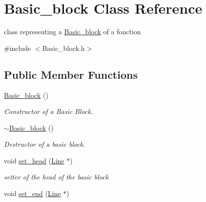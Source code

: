 \hypertarget{class_basic__block}{}\section{Basic\+\_\+block Class Reference}
\label{class_basic__block}


class representing a \hyperlink{class_basic__block}{Basic\+\_\+block} of a fonction  




{\ttfamily \#include $<$Basic\+\_\+block.\+h$>$}

\subsection*{Public Member Functions}
\begin{DoxyCompactItemize}
\item 
\hypertarget{class_basic__block_aa2455e1b1b8f5ac9b1c128f121fe3d67}{}\hyperlink{class_basic__block_aa2455e1b1b8f5ac9b1c128f121fe3d67}{Basic\+\_\+block} ()\label{class_basic__block_aa2455e1b1b8f5ac9b1c128f121fe3d67}

\begin{DoxyCompactList}\small\item\em Constructor of a Basic Block. \end{DoxyCompactList}\item 
\hypertarget{class_basic__block_a0047b58d9a30fa6eb79a87c70e9176d0}{}\hyperlink{class_basic__block_a0047b58d9a30fa6eb79a87c70e9176d0}{$\sim$\+Basic\+\_\+block} ()\label{class_basic__block_a0047b58d9a30fa6eb79a87c70e9176d0}

\begin{DoxyCompactList}\small\item\em Destructor of a basic block. \end{DoxyCompactList}\item 
\hypertarget{class_basic__block_a26c28c6f2fcd17afa65bf04e0ed75513}{}void \hyperlink{class_basic__block_a26c28c6f2fcd17afa65bf04e0ed75513}{set\+\_\+head} (\hyperlink{class_line}{Line} $\ast$)\label{class_basic__block_a26c28c6f2fcd17afa65bf04e0ed75513}

\begin{DoxyCompactList}\small\item\em setter of the head of the basic block \end{DoxyCompactList}\item 
\hypertarget{class_basic__block_ac43e4501aaa36135c87e03c00d9911ef}{}void \hyperlink{class_basic__block_ac43e4501aaa36135c87e03c00d9911ef}{set\+\_\+end} (\hyperlink{class_line}{Line} $\ast$)\label{class_basic__block_ac43e4501aaa36135c87e03c00d9911ef}


\end{DoxyCompactItemize}
